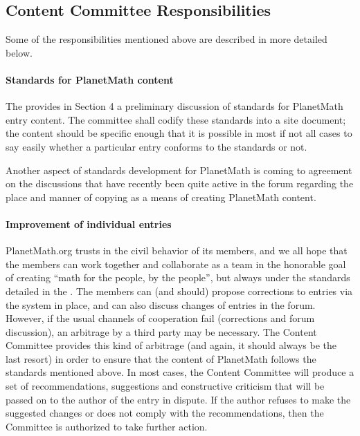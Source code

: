 \subsection*{Content Committee Responsibilities}

Some of the responsibilities mentioned above are described in more detailed below.

\paragraph{Standards for PlanetMath content}
The \texttt{} provides in Section 4 a preliminary discussion of standards for PlanetMath entry content. The committee shall codify these standards into a site document; the content should be specific enough that it is possible in most if not all cases to say easily whether a particular entry conforms to the standards or not.

Another aspect of standards development for PlanetMath is coming to agreement on the discussions that have recently been quite active in the forum regarding the place and manner of copying as a means of creating PlanetMath content.

\paragraph{Improvement of individual entries}
PlanetMath.org trusts in the civil behavior of its members, and we all hope that the members can work together and collaborate as a team in the honorable goal of creating ``math for the people, by the people'', but always under the standards detailed in the \texttt{}. The members can (and should) propose corrections to entries via the system in place, and can also discuss changes of entries in the forum. However, if the usual channels of cooperation fail (corrections and forum discussion), an arbitrage by a third party may be necessary. The Content Committee provides this kind of arbitrage (and again, it should always be the last resort) in order to ensure that the content of PlanetMath follows the standards mentioned above. In most cases, the Content Committee will produce a set of recommendations, suggestions and constructive criticism that will be passed on to the author of the entry in dispute. If the author refuses to make the suggested changes or does not comply with the recommendations, then the Committee is authorized to take further action.

